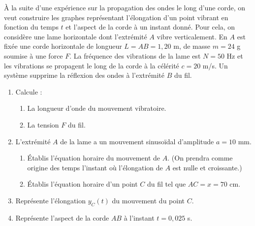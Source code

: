 \documentclass[11pt]{article}
\begin{document}
À la suite d'une expérience sur la propagation des ondes le long d'une corde, on veut construire les graphes représentant l'élongation d'un point vibrant en fonction du temps $t$ et l'aspect de la corde à un instant donné. Pour cela, on considère une lame horizontale dont l'extrémité $A$ vibre verticalement. En $A$ est fixée une corde horizontale de longueur $L = AB = 1{,}20$ m, de masse $m = 24$ g soumise à une force $F$. La fréquence des vibrations de la lame est $N = 50$ Hz et les vibrations se propagent le long de la corde à la célérité $c = 20$ m/s. Un système supprime la réflexion des ondes à l'extrémité $B$ du fil.

\begin{center}
\end{center}

\begin{enumerate}
  \item Calcule :
  \begin{enumerate}[label=\alph*.]
    \item La longueur d'onde du mouvement vibratoire.
    \item La tension $F$ du fil.
  \end{enumerate}
  \item L'extrémité $A$ de la lame a un mouvement sinusoïdal d'amplitude $a = 10$ mm.
  \begin{enumerate}[label=\alph*.]
    \item Établis l'équation horaire du mouvement de $A$. (On prendra comme origine des temps l'instant où l'élongation de $A$ est nulle et croissante.)
    \item Établis l'équation horaire d'un point $C$ du fil tel que $AC = x = 70$ cm.
  \end{enumerate}
  \item Représente l'élongation $y_C(t)$ du mouvement du point $C$.
  \item Représente l'aspect de la corde $AB$ à l'instant $t = 0{,}025$ s.
\end{enumerate}
\end{document}

